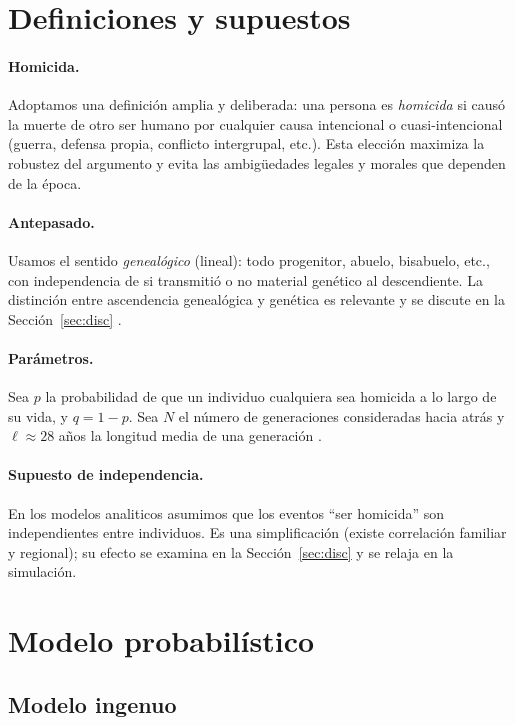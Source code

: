 \documentclass[11pt]{article}
\begin{document}
\section{Definiciones y supuestos}\label{sec:def}

\paragraph{Homicida.} Adoptamos una definici\'on amplia y deliberada: una
persona es \emph{homicida} si caus\'o la muerte de otro ser humano por cualquier
causa intencional o cuasi-intencional (guerra, defensa propia, conflicto
intergrupal, etc.). Esta elecci\'on maximiza la robustez del argumento y evita
las ambig\"uedades legales y morales que dependen de la \'epoca.

\paragraph{Antepasado.} Usamos el sentido \emph{geneal\'ogico} (lineal): todo
progenitor, abuelo, bisabuelo, etc., con independencia de si transmiti\'o o no
material gen\'etico al descendiente. La distinci\'on entre ascendencia
geneal\'ogica y gen\'etica es relevante y se discute en la
Secci\'on~\ref{sec:disc} \citep{ralph2013}.

\paragraph{Par\'ametros.} Sea $p$ la probabilidad de que un individuo cualquiera
sea homicida a lo largo de su vida, y $q = 1-p$. Sea $N$ el n\'umero de
generaciones consideradas hacia atr\'as y $\ell \approx 28$ a\~nos la longitud
media de una generaci\'on \citep{fenner2005}.

\paragraph{Supuesto de independencia.} En los modelos analiticos asumimos que
los eventos ``ser homicida'' son independientes entre individuos. Es una
simplificaci\'on (existe correlaci\'on familiar y regional); su efecto se examina
en la Secci\'on~\ref{sec:disc} y se relaja en la simulaci\'on.

\section{Modelo probabil\'istico}

\subsection{Modelo ingenuo}
\end{document}
